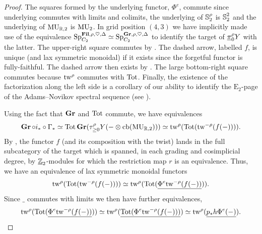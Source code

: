 \begin{proof}
  The squares formed by the underlying functor, $\Phi^e$, commute since underlying commutes with limits and colimits, the underlying of $\operatorname{\mathbb{S}}_2^\rho$ is $\operatorname{\mathbb{S}}_2^2$ and the underlying of $\operatorname{\mathrm{MU}}_{\mathbb{R},2}$ is $\operatorname{\mathrm{MU}}_2$.
  In grid position $(4,3)$ we have implicitly made use of the equivalence $\operatorname{\mathrm{Sp}}_{C_2} ^{\operatorname{\mathbf{Fil}},\rho,\heartsuit,\Delta} \simeq \operatorname{\mathrm{Sp}}_{C_2} ^{\operatorname{\mathbf{Gr}}, \rho, \heartsuit, \Delta}$ to identify the target of $\underline{\pi}_0 ^{\rho}Y$ with the latter. The upper-right square commutes by . The dashed arrow, labelled $f$, is unique (and lax symmetric monoidal) if it exists since the forgetful functor is fully-faithful. The dashed arrow then exists by . The large bottom-right square commutes because $\mathrm{tw}^{\rho}$ commutes with $\mathrm{Tot}$. Finally, the existence of the factorization along the left side is a corollary of our ability to identify the $\mathrm{E}_2$-page of the Adams--Novikov spectral sequence (see \cite{Adams}). %

  Using the fact that $\operatorname{\mathbf{Gr}}$ and $\mathrm{Tot}$ commute, we have equivalences
  \[ \operatorname{\mathbf{Gr}} \circ i_* \circ \Gamma_* \simeq \mathrm{Tot}  \operatorname{\mathbf{Gr}} ( \tau_{\geq 0}^\rho Y ( - \otimes \mathrm{cb}(\operatorname{\mathrm{MU}}_{\mathbb{R},2}))) \simeq \mathrm{tw}^{\rho} (\mathrm{Tot} (\mathrm{tw}^{-\rho}( f(-)))). \]
  By , the functor $f$ (and its composition with the twist) lands in the full subcategory of the target which is spanned, in each grading and cosimplicial degree, by $\underline{\mathbb{Z}}_{2}$-modules for which the restriction map $r$ is an equivalence. Thus, we have an equivalence of lax symmetric monoidal functors
  \[ \mathrm{tw}^{\rho} (\mathrm{Tot} (\mathrm{tw}^{-\rho}( f(-)))) \simeq \mathrm{tw}^{\rho} (\mathrm{Tot} (\underline{\Phi^e \mathrm{tw}^{-\rho}( f(-))})). \]
  Since $\_$ commutes with limits we then have further equivalences,
  \[ \mathrm{tw}^{\rho} (\mathrm{Tot} (\underline{\Phi^e \mathrm{tw}^{-\rho}( f(-))}))
  \simeq \mathrm{tw}^{\rho} ( \underline{\mathrm{Tot} (\Phi^e \mathrm{tw}^{-\rho}( f(-))) } )
  \simeq \mathrm{tw}^{\rho} ( \underline{  p_* h \Phi^e(-) } ). \qedhere \]
  

\end{proof}
